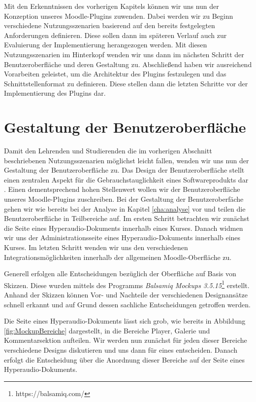 Mit den Erkenntnissen des vorherigen Kapitels können wir uns nun der Konzeption unseres Moodle-Plugins zuwenden. Dabei werden wir zu Beginn verschiedene Nutzungsszenarien basierend auf den bereits festgelegten Anforderungen definieren. Diese sollen dann im späteren Verlauf auch zur Evaluierung der Implementierung herangezogen werden. Mit diesen Nutzungsszenarien im Hinterkopf wenden wir uns dann im nächsten Schritt der Benutzeroberfläche und deren Gestaltung zu. Abschließend haben wir ausreichend Vorarbeiten geleistet, um die Architektur des Plugins festzulegen und das Schnittstellenformat zu definieren. Diese stellen dann die letzten Schritte vor der Implementierung des Plugins dar.



\section{Gestaltung der Benutzeroberfläche}
Damit den Lehrenden und Studierenden die im vorherigen Abschnitt beschriebenen Nutzungsszenarien möglichst leicht fallen, wenden wir uns nun der Gestaltung der Benutzeroberfläche zu. \glqq Das Design der Benutzeroberfläche stellt einen zentralen Aspekt für die Gebrauchstauglichkeit eines Softwareprodukts dar\grqq{} \citep[S. 1]{oppermann2002user}. Einen dementsprechend hohen Stellenwert wollen wir der Benutzeroberfläche unseres Moodle-Plugins zuschreiben. Bei der Gestaltung der Benutzeroberfäche gehen wir wie bereits bei der Analyse in Kapitel \ref{cha:analyse} vor und teilen die Benutzeroberfläche in Teilbereiche auf. Im ersten Schritt betrachten wir zunächst die Seite eines Hyperaudio-Dokuments innerhalb eines Kurses. Danach widmen wir uns der Administrationsseite eines Hyperaudio-Dokuments innerhalb eines Kurses. Im letzten Schritt wenden wir uns den verschiedenen Integrationsmöglichkeiten innerhalb der allgemeinen Moodle-Oberfläche zu.

Generell erfolgen alle Entscheidungen bezüglich der Oberfläche auf Basis von Skizzen. Diese wurden mittels des Programms \textit{Balsamiq Mockups 3.5.15}\footnote{https://balsamiq.com/} erstellt. Anhand der Skizzen können Vor- und Nachteile der verschiedenen Designansätze schnell erkannt und auf Grund dessen sachliche Entscheidungen getroffen werden. 


Die Seite eines Hyperaudio-Dokuments lässt sich grob, wie bereits in Abbildung \ref{fig:MockupBereiche} dargestellt, in die Bereiche Player, Galerie und Kommentarsektion aufteilen. Wir werden nun zunächst für jeden dieser Bereiche verschiedene Designs diskutieren und uns dann für eines entscheiden. Danach erfolgt die Entscheidung über die Anordnung dieser Bereiche auf der Seite eines Hyperaudio-Dokuments.


